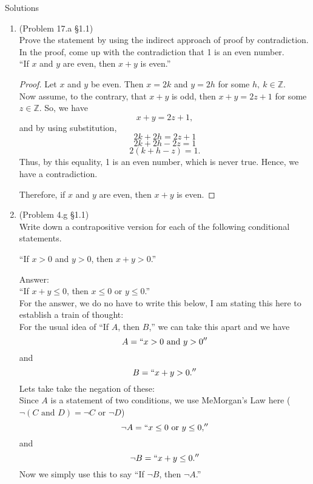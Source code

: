 \documentclass[12pt]{article}
\newcommand{\ZZ}{\mathbb{Z}}
\begin{document}
\begin{center}
Solutions
\end{center}
\begin{enumerate}[1.)]
\item (Problem 17.a \S1.1)\\
Prove the statement by using the indirect approach of proof by contradiction. In   the proof, come up with the contradiction that 1  is an even number.\\

``If $x$ and $y$ are even, then $x+y$ is even.''

\begin{proof}
Let $x$ and $y$ be even. Then $x=2k$ and $y=2h$ for some $h,\ k\in\ZZ$.\\
Now assume, to the contrary, that $x+y$ is odd, then $x+y=2z+1$ for some $z\in\ZZ$. So, we have
\[x+y=2z+1,\]
and by using substitution,
\[2k+2h=2z+1\]
\[2k+2h-2z=1\]
\[2(k+h-z)=1.\]
Thus, by this equality, 1 is an even number, which is never true. Hence, we have a contradiction.

Therefore, if $x$ and $y$ are even, then $x+y$ is even.


\end{proof}







\newpage
\item (Problem 4.g \S1.1)\\
Write down a contrapositive version for each of the following conditional statements.

``If $x>0$ and $y>0$, then $x+y>0$.''

Answer:\\
``If $x+y\leq 0$, then $x\leq 0$ or $y\leq 0$.''\\

For the answer, we do no have to write this below, I am stating this here to establish a train of thought:\\

For the usual idea of ``If $A$, then $B$,'' we can take this apart and we have
\[A=``x>0 \text{ and } y>0''\]
and
\[B=``x+y>0.''\]
Lets take take the negation of these:\\
Since $A$ is a statement of two conditions, we use MeMorgan's Law here ($\neg(C\text{ and }D)=\neg C\text{ or } \neg D$)
\[\neg A=``x\leq 0 \text{ or } y\leq 0,''\]
and
\[\neg B=``x+y\leq 0.''\]
Now we simply use this to say  ``If $\neg B$, then $\neg A$.''



\end{enumerate}
\end{document}
